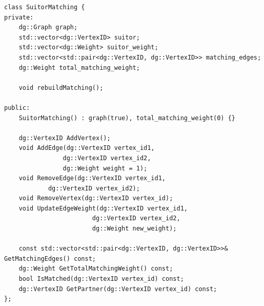 \begin{lstlisting}[style=thesiscpp, caption={Интерфејс класе \texttt{SuitorMatching}}, label={lst:sm_interface}]
class SuitorMatching {
private:
    dg::Graph graph;
    std::vector<dg::VertexID> suitor;
    std::vector<dg::Weight> suitor_weight;
    std::vector<std::pair<dg::VertexID, dg::VertexID>> matching_edges;
    dg::Weight total_matching_weight;

    void rebuildMatching();

public:
    SuitorMatching() : graph(true), total_matching_weight(0) {}

    dg::VertexID AddVertex();
    void AddEdge(dg::VertexID vertex_id1,
                dg::VertexID vertex_id2,
                dg::Weight weight = 1);
    void RemoveEdge(dg::VertexID vertex_id1,
            dg::VertexID vertex_id2);
    void RemoveVertex(dg::VertexID vertex_id);
    void UpdateEdgeWeight(dg::VertexID vertex_id1,
                        dg::VertexID vertex_id2,
                        dg::Weight new_weight);

    const std::vector<std::pair<dg::VertexID, dg::VertexID>>& GetMatchingEdges() const;
    dg::Weight GetTotalMatchingWeight() const;
    bool IsMatched(dg::VertexID vertex_id) const;
    dg::VertexID GetPartner(dg::VertexID vertex_id) const;
};

\end{lstlisting}

